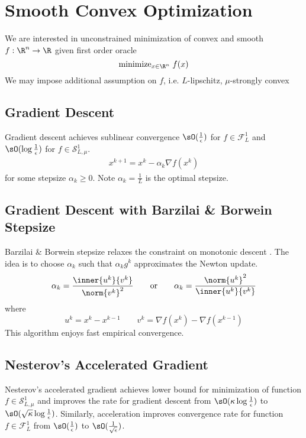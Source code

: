 \documentclass[11pt]{article}
\newcommand\scrF{\ensuremath{\mathscr{F}}}
\newcommand\scrS{\ensuremath{\mathscr{S}}}
\begin{document}
 


\section{Smooth Convex Optimization}


We are interested in unconstrained minimization of convex and smooth $f:\R^n \to \R$ given first order oracle
\[
    \text{minimize}_{x\in\R^n}\; f(x)
\]
We may impose additional assumption on $f$, i.e. $L$-lipschitz, $\mu$-strongly convex

\subsection{Gradient Descent}

Gradient descent achieves sublinear convergence $\sO(\frac{1}{\epsilon})$ for $f\in \scrF_{L}^1$ and $\sO(\log \frac{1}{\epsilon})$ for $f\in\scrS_{L,\mu}^1$. 
\begin{align*}
    x^{k+1} = x^k - \alpha_k \nabla f(x^k)
\end{align*}
for some stepsize $\alpha_k \geq 0$. Note $\alpha_k = \frac{1}{L}$ is the optimal stepsize. 

\subsection{Gradient Descent with Barzilai \& Borwein Stepsize}

Barzilai \& Borwein stepsize relaxes the constraint on monotonic descent \cite{barzilaiTwoPointStepSize1988}. The idea is to choose $\alpha_k$ such that $\alpha_k g^k$ approximates the Newton update.
\begin{align*}
    \alpha_k = \frac{\inner{u^k}{v^k}}{\norm{v^k}^2}
    \quad\quad\text{or}\quad\quad
    \alpha_k = \frac{\norm{u^k}^2}{\inner{u^k}{v^k}}
\end{align*}
where 
\[
    u^k = x^k - x^{k-1}
    \quad\quad
    v^k = \nabla f(x^k) - \nabla f(x^{k-1})
\]
This algorithm enjoys fast empirical convergence.

\subsection{Nesterov's Accelerated Gradient}

Nesterov's accelerated gradient achieves lower bound for minimization of function $f\in \scrS_{L,\mu}^1$ and improves the rate for gradient descent from $\sO(\kappa\log \frac{1}{\epsilon})$ to $\sO(\sqrt{\kappa}\log \frac{1}{\epsilon})$. Similarly, acceleration improves convergence rate for function $ f\in\scrF_{L}^1$ from $\sO(\frac{1}{\epsilon})$ to $\sO(\frac{1}{\sqrt{\epsilon}})$.
\end{document}

